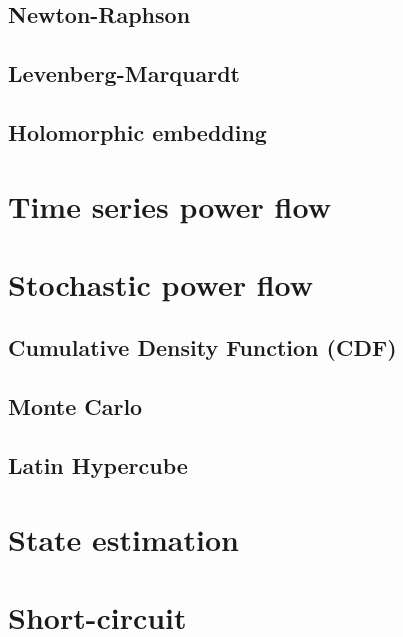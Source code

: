 \documentclass{tufte-book}
\begin{document}
\section{Newton-Raphson}


\section{Levenberg-Marquardt}


\section{Holomorphic embedding}




\chapter{Time series power flow}



\chapter{Stochastic power flow}

\section{Cumulative Density Function (CDF)}


\section{Monte Carlo}


\section{Latin Hypercube}




\chapter{State estimation}



\chapter{Short-circuit}





\backmatter





\printindex
\end{document}
